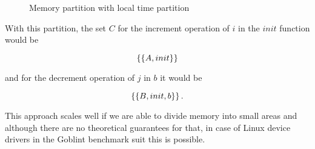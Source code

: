 \documentclass[..thesis.tex]{subfiles}
\newcommand{\opacity}{0.8}
\newcommand{\drawcube}[7]
{
      \filldraw[opacity=\opacity, #7, draw=black, dashed, xzp=#2] (#1,#3) rectangle (#4,#6);
      \filldraw[opacity=\opacity, #7, draw=black, dashed, xzp=#5] (#1,#3) rectangle (#4,#6);
      \filldraw[opacity=\opacity, #7, draw=black, dashed, xyp=#3] (#1,#2) rectangle (#4,#5);
      \filldraw[opacity=\opacity, #7, draw=black, dashed, xyp=#6] (#1,#2) rectangle (#4,#5);
      \filldraw[opacity=\opacity, #7, draw=black, dashed, yzp=#4] (#2,#3) rectangle (#5,#6);
}
\newcommand{\drawcubeoverz}[5]
{
 \drawcube{#1}{#2}{0}{#3}{#4}{\cubez}{#5}
}
\newcommand{\drawoutercube}
{
      \draw[thick,-] (0,0,0) -- ++(\cubex,0,0) -- ++(0,0,\cubez) -- node [anchor = north] {$B$} ++(-0.5*\cubex,0,0) --  node [anchor = north] {$A$} ++(-0.5*\cubex,0,0)  --   ++(0,0,-\cubez);
      \draw[thick,-] (0,\cubey,0) -- ++(\cubex,0,0) -- ++(0,0,\cubez) -- ++(-\cubex,0,0) --   ++(0,0,-\cubez)  ;

      \draw[thick,-] (0,0,0) -- (0,\cubey,0);
      \draw[thick,-] (\cubex,0,0) -- (\cubex,\cubey,0);
      \draw[thick,-] (\cubex,0,\cubez) -- ++(0,\cubey,0);
      \draw[thick,-] (0,0,\cubez) -- (0,\cubey,\cubez);
}
\newcommand{\defaultPColor}{yellow}
\newcommand{\defaultPRColor}{\defaultPColor!75}
\newcommand{\aColor}{blue}
\newcommand{\aRColor}{\aColor!75}
\newcommand{\bColor}{green}
\newcommand{\bRColor}{\bColor!95}
\newcommand{\defaultColor}{red}
\newcommand{\defaultRColor}{\defaultColor!75}
\begin{document}
\begin{figure}[H]
  \centering
    \caption{Memory partition with local time partition}
\end{figure}

With this partition, the set $C$ for the increment operation of $i$ in the $init$ function would be

\begin{equation*}
\left\lbrace \left\lbrace A, init \right\rbrace \right\rbrace
\end{equation*}

and for the decrement operation of $j$ in $b$ it would be

\begin{equation*}
\left\lbrace \left\lbrace B, init, b \right\rbrace \right\rbrace \text{.}
\end{equation*}


This approach scales well if we are able to divide memory into small areas and although there are no theoretical guarantees for that, in case of Linux device drivers in the Goblint benchmark suit this is possible.
\end{document}
